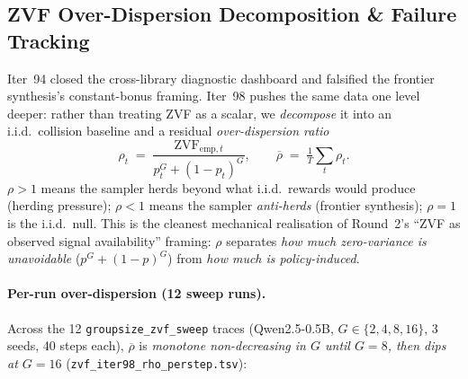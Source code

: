 
\subsection{ZVF Over-Dispersion Decomposition \& Failure Tracking}
\label{sec:zvf-overdispersion}

Iter~94 closed the cross-library diagnostic dashboard and falsified the
frontier synthesis's constant-bonus framing. Iter~98 pushes the same
data one level deeper: rather than treating ZVF as a scalar, we
\emph{decompose} it into an i.i.d.\ collision baseline and a residual
\emph{over-dispersion ratio}
\begin{equation}\label{eq:rho}
\rho_t \;=\; \frac{\mathrm{ZVF}_{\mathrm{emp},t}}{p_t^{G} + (1-p_t)^{G}},
\qquad \overline{\rho} \;=\; \tfrac{1}{T}\sum_t \rho_t.
\end{equation}
$\rho>1$ means the sampler herds beyond what i.i.d.\ rewards would
produce (herding pressure); $\rho<1$ means the sampler
\emph{anti-herds} (frontier synthesis); $\rho=1$ is the i.i.d.\ null.
This is the cleanest mechanical realisation of Round~2's ``ZVF as
observed signal availability'' framing: $\rho$ separates \emph{how
much zero-variance is unavoidable} ($p^{G}+(1-p)^{G}$) from \emph{how
much is policy-induced}.

\paragraph{Per-run over-dispersion (12 sweep runs).}
Across the 12 \texttt{groupsize\_zvf\_sweep} traces (Qwen2.5-0.5B,
$G\in\{2,4,8,16\}$, 3 seeds, 40 steps each), $\overline{\rho}$ is
\emph{monotone non-decreasing in $G$ until $G=8$, then dips at $G=16$}
(\texttt{zvf\_iter98\_rho\_perstep.tsv}):

